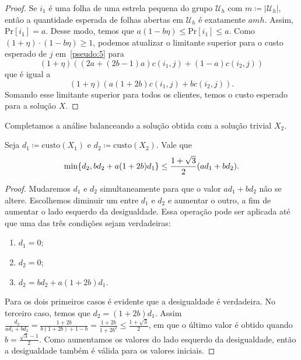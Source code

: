 \begin{proof}
    Se $i_1$ é uma folha de uma estrela pequena do grupo $\mathcal{U}_h$ com $m \coloneqq |\mathcal{U}_h|$, então a quantidade esperada de folhas abertas em $\mathcal{U}_h$ é exatamente $amh$. Assim, Pr$[i_1] = a$. Desse modo, temos que $a(1 - b\eta) \leq \text{Pr}[i_1] \leq a$. Como $(1+\eta)\cdot(1 - b\eta) \geq 1$, podemos atualizar o limitante superior para o custo esperado de $j$ em~\eqref{pseudo:5} para
    \begin{equation}
        (1 + \eta) ((2a + (2b - 1)a)c(i_1,j) + (1 - a) c(i_2,j)) \nonumber
    \end{equation}
    que é igual a 
    \begin{equation}
        (1 + \eta) (a (1 + 2b)c(i_1,j) + bc(i_2,j)) \nonumber.
    \end{equation}
    Somando esse limitante superior para todos os clientes, temos o custo esperado para a solução $X$.
\end{proof}

Completamos a análise balanceando a solução obtida com a solução trivial $X_2$.

\begin{lemma} \label{lemma:5.12}
    Seja $d_1 \coloneqq \mathrm{custo}(X_1)$ e $d_2 \coloneqq \mathrm{custo}(X_2)$. Vale que \[\min\{d_2,bd_2 + a(1+2b)d_1\} \leq \frac{1 + \sqrt{3}}{2}(ad_1 + b d_2).\]
\end{lemma}

\begin{proof}
    Mudaremos $d_1$ e $d_2$ simultaneamente para que o valor $ad_1 + bd_2$ não se altere. Escolhemos diminuir um entre $d_1$ e $d_2$ e aumentar o outro, a fim de aumentar o lado esquerdo da desigualdade. Essa operação pode ser aplicada até que uma das três condições sejam verdadeiras:
    \begin{enumerate}
        \item $d_1 = 0$;
        \item $d_2 = 0$;
        \item $d_2 = bd_2 + a (1 + 2b)d_1$.
    \end{enumerate}

    Para os dois primeiros casos é evidente que a desigualdade é verdadeira. No terceiro caso, temos que $d_2 = (1 + 2b)d_1$. Assim 
    \(\frac{d_2}{ad_1 + bd_2} = \frac{1 +2b}{b(1+2b) + 1 - b} = \frac{1+2b}{1+2b^2} \leq \frac{1+\sqrt{3}}{2}\), em que o último valor é obtido quando $b = \frac{\sqrt{3} - 1}{2}$. Como aumentamos os valores do lado esquerdo da desigualdade, então a desigualdade também é válida para os valores iniciais.
\end{proof}

